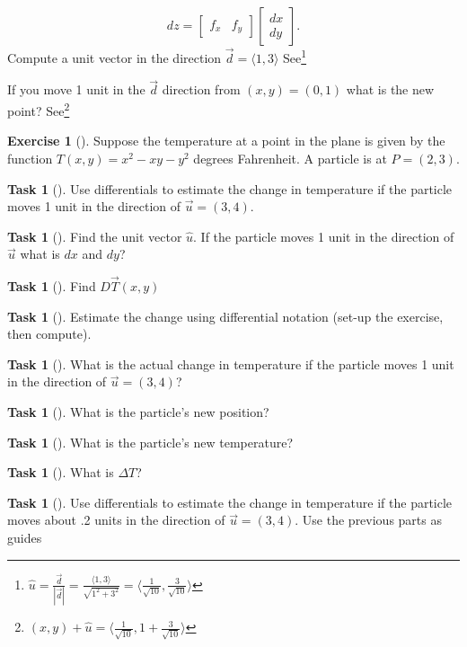 \documentclass[10pt,]{book}
\theoremstyle{plain}
\theoremstyle{definition}
\theoremstyle{definition}
\theoremstyle{definition}
\theoremstyle{definition}
\newtheorem{exploration}[project]{Exercise}
\newtheorem{task}[project]{Task}
\theoremstyle{definition}
\numberwithin{equation}{section}
\newcommand{\amp}{&}
\begin{document}
\begin{equation*}
dz = \begin{bmatrix}f_x\amp f_y
\end{bmatrix}  \begin{bmatrix}dx\\dy
\end{bmatrix} .
\end{equation*}
%
Compute a unit vector in the direction \(\vec{d}=\langle 1,3 \rangle\) See\footnote{\(\hat{u}=\frac{\vec{d}}{|\vec{d}|}=\frac{\langle 1,3 \rangle}{\sqrt{1^2+3^2}}=\langle \frac{1}{\sqrt{10}}, \frac{3}{\sqrt{10}} \rangle\)\label{fn-21}}%
 \par
If you move 1 unit in the \(\vec{d}\) direction from \((x,y)=(0,1)\) what is the new point? See\footnote{\((x,y)+\hat{u}=\langle \frac{1}{\sqrt{10}}, 1+\frac{3}{\sqrt{10}} \rangle\)\label{fn-22}}%
\begin{exploration}[]\label{exploration-226}
Suppose the temperature at a point in the plane is given by the function {\(T(x,y)=x^2-xy-y^2\)} degrees Fahrenheit. A particle is at \(P=(2,3)\).%
\begin{task}[]\label{task-593}
Use differentials to estimate the change in temperature if the particle moves 1 unit in the direction of \(\vec u=\left(3,4\right)\).%
\begin{task}[]\label{task-594}
Find the unit vector \(\hat{u}\). If the particle moves 1 unit in the direction of \(\vec{u}\) what is \(dx\) and \(dy\)?%
\end{task}
\begin{task}[]\label{task-595}
Find \(D\vec{T}(x,y)\)%
\end{task}
\begin{task}[]\label{task-596}
Estimate the change using differential notation (set-up the exercise, then compute).%
\end{task}
\end{task}
\begin{task}[]\label{task-597}
What is the actual change in temperature if the particle moves 1 unit in the direction of \(\vec u=\left(3,4\right)\)?%
\begin{task}[]\label{task-598}
What is the particle's new position?%
\end{task}
\begin{task}[]\label{task-599}
What is the particle's new temperature?%
\end{task}
\begin{task}[]\label{task-600}
What is \(\Delta T\)?%
\end{task}
\end{task}
\begin{task}[]\label{task-601}
Use differentials to estimate the change in temperature if the particle moves about .2 units in the direction of \(\vec u=\left(3,4\right)\). Use the previous parts as guides%
%
\end{task}
\end{exploration}
\end{document}
